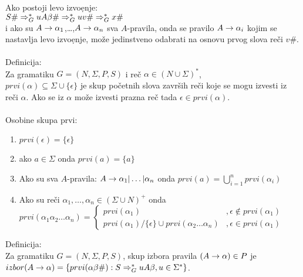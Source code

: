       Ako postoji levo izvo\d enje:\\
      $S\#\Rightarrow^{*}_{G}uA\beta\#\Rightarrow^{*}_{G}uv\#\Rightarrow^{*}_{G}x\#$\\
      i ako su $A\rightarrow\alpha_{1}$,\ldots,$A\rightarrow\alpha_{n}$ sva $A$-pravila,
      onda se pravilo $A\rightarrow\alpha_{i}$ kojim se nastavlja levo izvo\d enje,
      mo\v ze jedinstveno odabrati na osnovu prvog slova re\v ci $v\#$.\\
      \\
      Definicija:\\
      Za gramatiku $G=(N,\Sigma,P,S)$ i re\v c $\alpha\in(N\cup\Sigma)^{*}$,\\
      $prvi(\alpha)\subseteq\Sigma\cup\{\epsilon\}$ je skup po\v cetnih
      slova zavr\v sih re\v ci koje se mogu izvesti iz re\v ci $\alpha$.
      Ako se iz $\alpha$ mo\v ze izvesti prazna re\v c tada
      $\epsilon\in prvi(\alpha)$.\\
      \\
      Osobine skupa prvi:
      \begin{enumerate}
      \item
      {
        $prvi(\epsilon)=\{\epsilon\}$
      }
      \item
      {
        ako $a\in\Sigma$ onda $prvi(a)=\{a\}$
      }
      \item
      {
        Ako su sva $A$-pravila: $A\rightarrow\alpha_{1}|\ldots|\alpha_{n}$ onda
        $prvi(a)=\bigcup^{n}_{i=1}prvi(\alpha_{i})$
      }
      \item
      {
        Ako su re\v ci $\alpha_{1},\ldots,\alpha_{n}\in(\Sigma\cup N)^{+}$ onda\\
        $
          prvi(\alpha_{1}\alpha_{2}\ldots\alpha_{n})=
          \left\{
          \begin{array}{ll}
            prvi(\alpha_{1})                                                  &,\epsilon\notin prvi(\alpha_{1})\\
            prvi(\alpha_{1})/\{\epsilon\}\cup prvi(\alpha_{2}\ldots\alpha_{n})&,\epsilon\in prvi(\alpha_{1})
          \end{array}
          \right.
        $
      }
      \end{enumerate}
      Definicija:\\
      Za gramatiku $G=(N,\Sigma,P,S)$, skup izbora pravila
      $(A\rightarrow\alpha)\in P$ je\\
      $izbor(A\rightarrow\alpha)=\{prvi(\alpha\beta\#):S\Rightarrow^{*}_{G}uA\beta, u\in\Sigma^{*}\}$.\\
      \\
